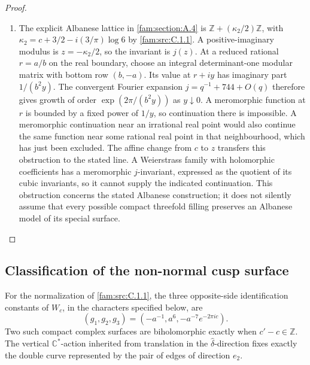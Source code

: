 \begin{proof}
\begin{enumerate}[label=\arabic*.,leftmargin=*]
\item The explicit Albanese lattice in \ref{fam:section:A.4} is
$\mathbb Z+(\kappa_2/2)\mathbb Z$, with
$\kappa_2=c+3/2-i(3/\pi)\log6$ by \ref{fam:src:C.1.1}. A positive-imaginary modulus is
$z=-\kappa_2/2$, so the invariant is $j(z)$. At a reduced rational
$r=a/b$ on the real boundary, choose an integral determinant-one modular
matrix with bottom row $(b,-a)$. Its value at $r+iy$ has imaginary part
$1/(b^2y)$. The convergent Fourier expansion $j=q^{-1}+744+O(q)$ therefore
gives growth of order $\exp(2\pi/(b^2y))$ as $y\downarrow0$.
A meromorphic function at $r$ is bounded by a fixed power of $1/y$,
so continuation there is impossible. A meromorphic continuation near an
irrational real point would also continue the same function near some
rational real point in that neighbourhood, which has just been excluded.
The affine change from $c$ to $z$ transfers this obstruction to the
stated line. A Weierstrass family with holomorphic coefficients has a
meromorphic $j$-invariant, expressed as the quotient of its cubic
invariants, so it cannot supply the indicated continuation. This
obstruction concerns the stated Albanese construction; it does not
silently assume that every possible compact threefold filling preserves
an Albanese model of its special surface.
\end{enumerate}
\end{proof}

\subsection{Classification of the non-normal cusp surface}\hypertarget{tag-01PO}{}\label{fam:section:C.4}
\begin{theorem}\hypertarget{tag-01QQ}{}\label{fam:src:C.4.1}\label{fam:st:C.4.1}

For the normalization of \ref{fam:src:C.1.1}, the three opposite-side identification
constants of \(W_c\), in the characters specified below, are
\[
 (g_1,g_2,g_3)=(-a^{-1},a^6,-a^{-7}e^{-2\pi ic}).
\]
Two such compact complex surfaces are biholomorphic exactly when
\(c'-c\in\mathbb Z\). The vertical \(\mathbb C^*\)-action inherited from
translation in the \(\widehat\delta\)-direction fixes exactly the double
curve represented by the pair of edges of direction \(e_2\).
\end{theorem}


